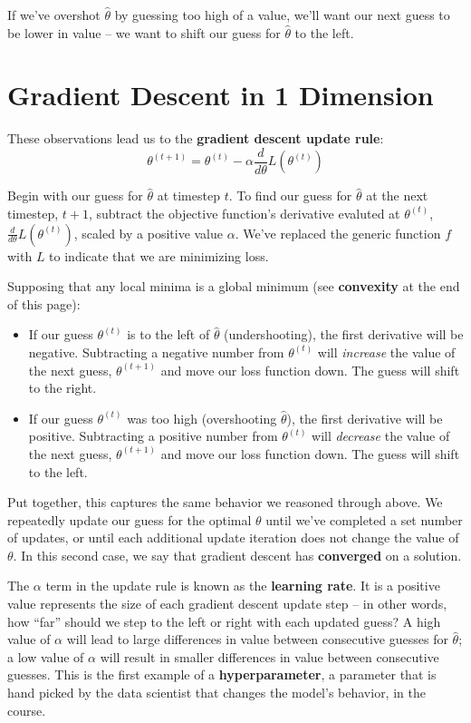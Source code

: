 \documentclass[
  letterpaper,
  DIV=11,
  numbers=noendperiod]{scrreprt}
\providecommand{\tightlist}{%
  \setlength{\itemsep}{0pt}\setlength{\parskip}{0pt}}\usepackage{longtable,booktabs,array}
\begin{document}
If we've overshot \(\hat{\theta}\) by guessing too high of a value,
we'll want our next guess to be lower in value -- we want to shift our
guess for \(\hat{\theta}\) to the left.

\hypertarget{gradient-descent-in-1-dimension}{%
\section{Gradient Descent in 1
Dimension}\label{gradient-descent-in-1-dimension}}

These observations lead us to the \textbf{gradient descent update rule}:
\[\theta^{(t+1)} = \theta^{(t)} - \alpha \frac{d}{d\theta}L(\theta^{(t)})\]

Begin with our guess for \(\hat{\theta}\) at timestep \(t\). To find our
guess for \(\hat{\theta}\) at the next timestep, \(t+1\), subtract the
objective function's derivative evaluted at \(\theta^{(t)}\),
\(\frac{d}{d\theta} L(\theta^{(t)})\), scaled by a positive value
\(\alpha\). We've replaced the generic function \(f\) with \(L\) to
indicate that we are minimizing loss.

Supposing that any local minima is a global minimum (see
\textbf{convexity} at the end of this page):

\begin{itemize}
\tightlist
\item
  If our guess \(\theta^{(t)}\) is to the left of \(\hat{\theta}\)
  (undershooting), the first derivative will be negative. Subtracting a
  negative number from \(\theta^{(t)}\) will \emph{increase} the value
  of the next guess, \(\theta^{(t+1)}\) and move our loss function down.
  The guess will shift to the right.
\item
  If our guess \(\theta^{(t)}\) was too high (overshooting
  \(\hat{\theta}\)), the first derivative will be positive. Subtracting
  a positive number from \(\theta^{(t)}\) will \emph{decrease} the value
  of the next guess, \(\theta^{(t+1)}\) and move our loss function down.
  The guess will shift to the left.
\end{itemize}

Put together, this captures the same behavior we reasoned through above.
We repeatedly update our guess for the optimal \(\theta\) until we've
completed a set number of updates, or until each additional update
iteration does not change the value of \(\theta\). In this second case,
we say that gradient descent has \textbf{converged} on a solution.

The \(\alpha\) term in the update rule is known as the \textbf{learning
rate}. It is a positive value represents the size of each gradient
descent update step -- in other words, how ``far'' should we step to the
left or right with each updated guess? A high value of \(\alpha\) will
lead to large differences in value between consecutive guesses for
\(\hat{\theta}\); a low value of \(\alpha\) will result in smaller
differences in value between consecutive guesses. This is the first
example of a \textbf{hyperparameter}, a parameter that is hand picked by
the data scientist that changes the model's behavior, in the course.
\end{document}
